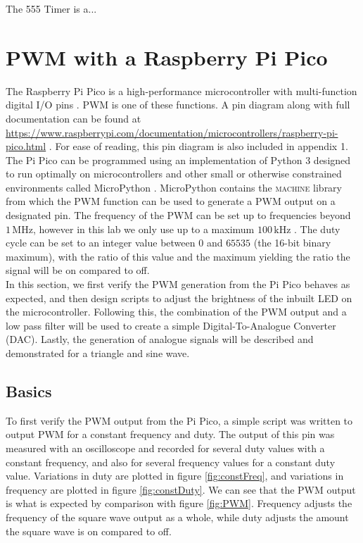 \documentclass[%
 reprint,
 amsmath,amssymb,
 aps,
]{revtex4-2}
\begin{document}
    The 555 Timer is a...


\section{PWM with a Raspberry Pi Pico}
The Raspberry Pi Pico is a high-performance microcontroller with multi-function digital I/O pins \cite{Pi, ucd}. PWM is one of these functions. A pin diagram along with full documentation can be found at \url{https://www.raspberrypi.com/documentation/microcontrollers/raspberry-pi-pico.html} \cite{Pi}. For ease of reading, this pin diagram is also included in appendix 1.\\

The Pi Pico can be programmed using an implementation of Python 3 designed to run optimally on microcontrollers and other small or otherwise constrained environments called MicroPython \cite{micropython}. MicroPython contains the \textsc{machine} library from which the \textsc{PWM} function can be used to generate a PWM output on a designated pin. The frequency of the PWM can be set up to frequencies beyond $1\,\text{MHz}$, however in this lab we only use up to a maximum $100 \,\text{kHz}$ \cite{ucd}. The duty cycle can be set to an integer value between $0$ and $65535$ (the 16-bit binary maximum), with the ratio of this value and the maximum yielding the ratio the signal will be on compared to off.\\

In this section, we first verify the PWM generation from the Pi Pico behaves as expected, and then design scripts to adjust the brightness of the inbuilt LED on the microcontroller. Following this, the combination of the PWM output and a low pass filter will be used to create a simple Digital-To-Analogue Converter (DAC). Lastly, the generation of analogue signals will be described and demonstrated for a triangle and sine wave.
    
    \subsection{Basics}
    To first verify the PWM output from the Pi Pico, a simple script was written to output PWM for a constant frequency and duty. The output of this pin was measured with an oscilloscope and recorded for several duty values with a constant frequency, and also for several frequency values for a constant duty value. Variations in duty are plotted in figure \ref{fig:constFreq}, and variations in frequency are plotted in figure \ref{fig:constDuty}. We can see that the PWM output is what is expected by comparison with figure \ref{fig:PWM}. Frequency adjusts the frequency of the square wave output as a whole, while duty adjusts the amount the square wave is on compared to off.\\
\end{document}
